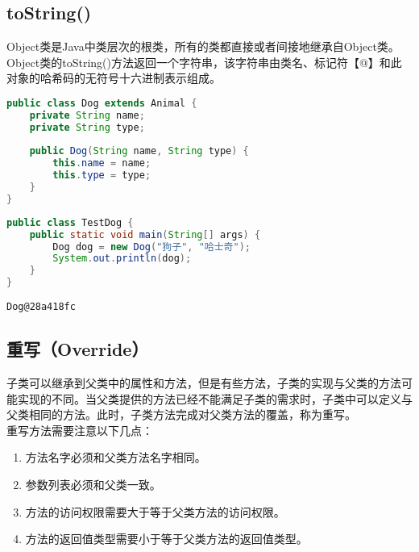 \subsection{toString()}

Object类是Java中类层次的根类，所有的类都直接或者间接地继承自Object类。Object类的toString()方法返回一个字符串，该字符串由类名、标记符【@】和此对象的哈希码的无符号十六进制表示组成。 \\


\begin{lstlisting}[language=Java, title=Dog.java]
public class Dog extends Animal {
    private String name;
    private String type;
    
    public Dog(String name, String type) {
        this.name = name;
        this.type = type;
    }   
}
\end{lstlisting}

\begin{lstlisting}[language=Java, title=TestDog.java]
public class TestDog {
    public static void main(String[] args) {
        Dog dog = new Dog("狗子", "哈士奇");
        System.out.println(dog);
    }
}
\end{lstlisting}

\begin{tcolorbox}
	\begin{verbatim}
Dog@28a418fc
	\end{verbatim}
\end{tcolorbox}

\subsection{重写（Override）}

子类可以继承到父类中的属性和方法，但是有些方法，子类的实现与父类的方法可能实现的不同。当父类提供的方法已经不能满足子类的需求时，子类中可以定义与父类相同的方法。此时，子类方法完成对父类方法的覆盖，称为重写。 \\

重写方法需要注意以下几点：

\begin{enumerate}
	\item 方法名字必须和父类方法名字相同。
	\item 参数列表必须和父类一致。
	\item 方法的访问权限需要大于等于父类方法的访问权限。
	\item 方法的返回值类型需要小于等于父类方法的返回值类型。
\end{enumerate}

